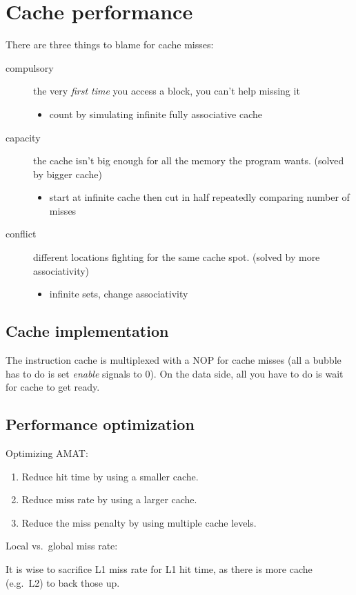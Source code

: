 \section{Cache performance}
There are three things to blame for cache misses:
\begin{description}
	\item[compulsory] the very \emph{first time} you access a block, you can't help missing it
	\begin{itemize}
		\item count by simulating infinite fully associative cache
	\end{itemize}
	\item[capacity] the cache isn't big enough for all the memory the program wants. (solved by bigger cache) 
	\begin{itemize}
		\item start at infinite cache then cut in half repeatedly comparing number of misses
	\end{itemize}
	\item[conflict] different locations fighting for the same cache spot. (solved by more associativity)
	\begin{itemize}
		\item infinite sets, change associativity
	\end{itemize}
\end{description}

\subsection{Cache implementation}
The instruction cache is multiplexed with a NOP for cache misses (all a bubble has to do is set \emph{enable} signals to 0). On the data side, all you have to do is wait for cache to get ready.

\subsection{Performance optimization}
Optimizing AMAT:
\begin{enumerate}
	\item Reduce hit time by using a smaller cache.
	\item Reduce miss rate by using a larger cache.
	\item Reduce the miss penalty by using multiple cache levels.
\end{enumerate}
Local vs.~global miss rate:
It is wise to sacrifice L1 miss rate for L1 hit time, as there is more cache (e.g.~L2) to back those up.